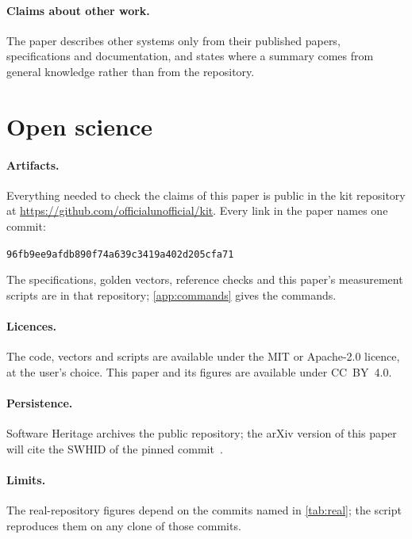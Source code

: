 \documentclass[10pt,letterpaper]{article}
\theoremstyle{remark}
\newcommand{\kit}{\textsf{kit}}
\newcommand{\sha}{96fb9ee9afdb890f74a639c3419a402d205cfa71}
\begin{document}
\paragraph{Claims about other work.} The paper describes other systems only
from their published papers, specifications and documentation, and states
where a summary comes from general knowledge rather than from the repository.

\section{Open science}\label{app:open}

\paragraph{Artifacts.} Everything needed to check the claims of this paper is
public in the \kit{} repository at
\url{https://github.com/officialunofficial/kit}. Every link in the paper names
one commit:
\begin{center}\texttt{\sha}\end{center}
The specifications, golden vectors, reference checks and this paper's
measurement scripts are in that repository; \cref{app:commands} gives the
commands.

\paragraph{Licences.} The code, vectors and scripts are available under the MIT
or Apache-2.0 licence, at the user's choice. This paper and its figures are
available under CC~BY~4.0.

\paragraph{Persistence.} Software Heritage archives the public repository;
the arXiv version of this paper will cite the SWHID of the pinned
commit~\cite{swhid}.

\paragraph{Limits.} The real-repository figures depend on the commits
named in \cref{tab:real}; the script reproduces them on any clone of those
commits.
\end{document}
